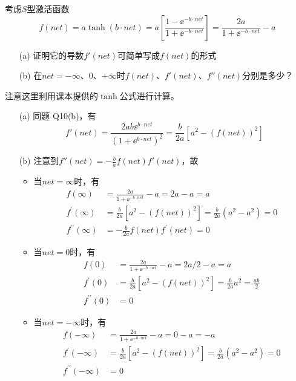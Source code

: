 \documentclass[reportComp]{thesis}
\begin{document}
\begin{question}[\textsection 6 Q26]
考虑$S$型激活函数
\[f(net) = a \tanh (b\cdot net)
= a\left[\frac{1-\ee^{-b \cdot net}}{1+\ee^{-b\cdot net}}\right]
= \frac{2 a}{1+\ee^{-b\cdot net}}-a\]
\begin{itemize}
	\item [(a)] 证明它的导数$f'(net)$可简单写成$f(net)$的形式
	\item [(b)] 在$net=-\infty$、$0$、$+\infty$时$f(net)$、$f'(net)$、$f''(net)$分别是多少？
\end{itemize}
\end{question}
\begin{answer}
注意这里利用课本提供的$\tanh$公式进行计算。
\begin{itemize}
	\item [(a)] 同题 Q10(b)，有
	\[f'(net)=\frac{2ab\ee^{b\cdot net}}{(1+\ee^{b\cdot net})^2}=\frac{b}{2a}[a^2-(f(net))^2]\]
	\item [(b)] 注意到$f''(net)=-\frac{b}{a}f(net)f'(net)$，故
	\begin{itemize}
		\item 当$net=\infty$时，有
		\[\begin{aligned}
		f(\infty) &=\frac{2 a}{1+\ee^{-b\cdot n e t}}-a=2 a-a=a \\
		f^{\prime}(\infty) &=\frac{b}{2 a}\left[a^{2}-(f(n e t))^{2}\right]=\frac{b}{2 a}\left(a^{2}-a^{2}\right)=0 \\
		f^{\prime \prime}(\infty) &=-\frac{b}{2 a} f(n e t) f^{\prime}(n e t)=0
		\end{aligned}\]
		\item 当$net=0$时，有
		\[\begin{aligned}
		f(0) &=\frac{2 a}{1+\ee^{-b\cdot n e t}}-a=2 a/2-a=a \\
		f^{\prime}(0) &=\frac{b}{2 a}\left[a^{2}-(f(n e t))^{2}\right]=\frac{b}{2 a}a^2=\frac{ab}{2} \\
		f^{\prime \prime}(0) &= 0
		\end{aligned}\]
		\item 当$net=-\infty$时，有
		\[\begin{aligned}
		f(-\infty) &=\frac{2 a}{1+\ee^{-b\cdot n e t}}-a=0-a=-a \\
		f^{\prime}(-\infty) &=\frac{b}{2 a}\left[a^{2}-(f(n e t))^{2}\right]=\frac{b}{2 a}\left(a^{2}-a^{2}\right)=0 \\
		f^{\prime \prime}(-\infty) &=0
		\end{aligned}\]
	\end{itemize}
\end{itemize}
\end{answer}
\end{document}
